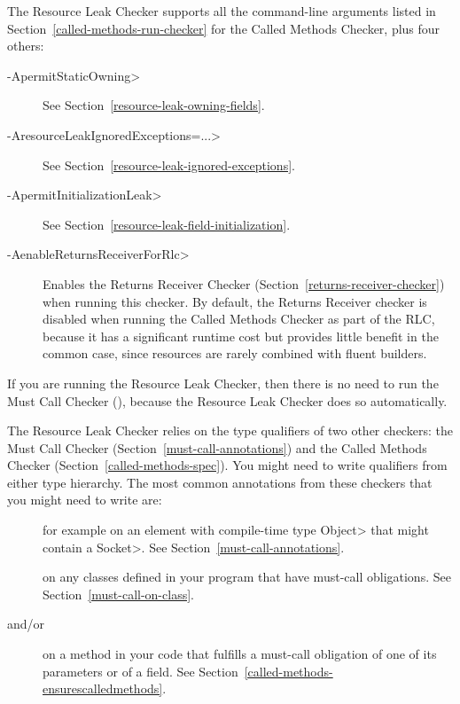 The Resource Leak Checker supports all the command-line arguments
listed in Section~\ref{called-methods-run-checker} for
the Called Methods Checker, plus four others:

\begin{description}
\item[\<-ApermitStaticOwning>]
  See Section~\ref{resource-leak-owning-fields}.
\item[\<-AresourceLeakIgnoredExceptions=...>]
  See Section~\ref{resource-leak-ignored-exceptions}.
\item[\<-ApermitInitializationLeak>]
  See Section~\ref{resource-leak-field-initialization}.
\item[\<-AenableReturnsReceiverForRlc>]
  Enables the Returns Receiver Checker (Section~\ref{returns-receiver-checker})
  when running this checker. By default, the Returns Receiver checker is
  disabled when running the Called Methods Checker as part of the RLC,
  because it has a significant runtime cost but provides little benefit in the common case,
  since resources are rarely combined with fluent builders.
\end{description}

If you are running the Resource Leak Checker, then there is no need to run
the Must Call Checker (), because the
Resource Leak Checker does so automatically.



The Resource Leak Checker relies on the type qualifiers of two other checkers:
the Must Call Checker (Section~\ref{must-call-annotations}) and
the Called Methods Checker (Section~\ref{called-methods-spec}). You might need
to write qualifiers from either type hierarchy. The most common annotations from
these checkers that you might need to write are:

\begin{description}

\item[]
for example on an element with compile-time type \<Object> that might contain a \<Socket>.
See Section~\ref{must-call-annotations}.

\item[]
on any classes defined in your program that have must-call obligations. See Section~\ref{must-call-on-class}.

\item[ and/or
      ]
on a method in your code that fulfills a must-call obligation of one of its parameters or of a field.
See Section~\ref{called-methods-ensurescalledmethods}.

\end{description}

